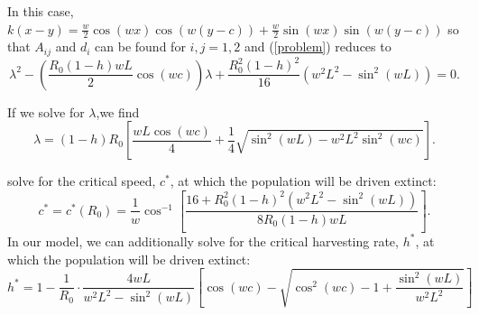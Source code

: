 \documentclass[12pt,english]{article}
\begin{document}
In this case, $k(x-y)=\frac{w}{2}\cos(wx)\cos(w(y-c))+\frac{w}{2}\sin(wx)\sin(w(y-c))$ so that $A_{ij}$ and $d_i$ can be found for $i,j=1,2$ and (\ref{problem}) reduces to 
$$\lambda^2-\left(\frac{R_0(1-h)wL}{2}\cos(wc)\right)\lambda+\frac{R_0^2(1-h)^2}{16}\left(w^2L^2-\sin^2(wL)\right)=0.$$

If we solve for $\lambda$,we find
\begin{equation*} \lambda=(1-h)R_0\left[\frac{wL\cos(wc)}{4}+\frac{1}{4}\sqrt{\sin^2(wL)-w^2L^2\sin^2(wc)}\right]. \label{cosine} \end{equation*}


\citet{ZhouKot2011} solve for the critical speed, $c^*$, at which the population will be driven extinct:
$$c^*=c^*(R_0)=\frac{1}{w}\cos^{-1}\left[\frac{16+R_0^2(1-h)^2(w^2L^2-\sin^2(wL))}{8R_0(1-h)wL}\right].$$
In our model, we can additionally solve for the critical harvesting rate, $h^*$, at which the population will be driven extinct:
$$
h^*=1-\frac{1}{R_0}\cdot\frac{4wL}{w^2L^2-\sin^2(wL)}\left[\cos(wc)-\sqrt{\cos^2(wc)-1+\frac{\sin^2(wL)}{w^2L^2}}\right] 
$$
\end{document}
